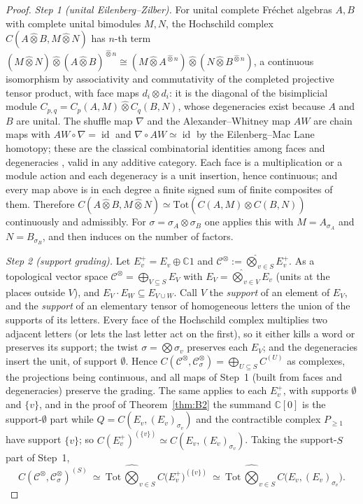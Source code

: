 \documentclass[11pt]{amsart}
\theoremstyle{definition}
\theoremstyle{remark}
\newcommand{\C}{\mathbb C}
\newcommand{\id}{\operatorname{id}}
\begin{document}
\begin{proof}
\emph{Step 1 (unital Eilenberg--Zilber).}  For unital complete Fr\'echet
algebras $A,B$ with complete unital bimodules $M,N$, the Hochschild complex
$C(A\widehat\otimes B,M\widehat\otimes N)$ has $n$-th term
$(M\widehat\otimes N)\widehat\otimes(A\widehat\otimes B)^{\widehat\otimes n}
\cong(M\widehat\otimes A^{\widehat\otimes n})\widehat\otimes
(N\widehat\otimes B^{\widehat\otimes n})$, a continuous isomorphism by
associativity and commutativity of the completed projective tensor product,
with face maps $d_i\otimes d_i$: it is the diagonal of the bisimplicial module
$C_{p,q}=C_p(A,M)\widehat\otimes C_q(B,N)$, whose degeneracies exist because
$A$ and $B$ are unital.  The shuffle map $\nabla$ and the Alexander--Whitney
map $AW$ are chain maps with $AW\circ\nabla=\id$ and $\nabla\circ AW\simeq\id$
by the Eilenberg--Mac Lane homotopy; these are the classical combinatorial
identities among faces and degeneracies \cite[VIII.8]{MacLane}, valid in any
additive category.  Each face is a multiplication or a module action and each
degeneracy is a unit insertion, hence continuous; and every map above is in
each degree a finite signed sum of finite composites of them.  Therefore
$C(A\widehat\otimes B,M\widehat\otimes N)\simeq
\mathrm{Tot}(C(A,M)\widehat\otimes C(B,N))$ continuously and admissibly.  For
$\sigma=\sigma_A\otimes\sigma_B$ one applies this with $M=A_{\sigma_A}$ and
$N=B_{\sigma_B}$, and then induces on the number of factors.

\emph{Step 2 (support grading).}  Let $E_v^{+}=E_v\oplus\C1$ and
$\mathcal C^{\otimes}:=\widehat\bigotimes_{v\in S}E_v^{+}$.  As a topological
vector space $\mathcal C^{\otimes}=\bigoplus_{V\subseteq S}E_V$ with
$E_V=\widehat\bigotimes_{v\in V}E_v$ (units at the places outside $V$), and
$E_V\cdot E_W\subseteq E_{V\cup W}$.  Call $V$ the \emph{support} of an element
of $E_V$, and the \emph{support} of an elementary tensor of homogeneous letters
the union of the supports of its letters.  Every face of the Hochschild
complex multiplies two adjacent letters (or lets the last letter act on the
first), so it either kills a word or preserves its support; the twist
$\sigma=\bigotimes\sigma_v$ preserves each $E_V$; and the degeneracies insert
the unit, of support $\emptyset$.  Hence $C(\mathcal C^{\otimes},
\mathcal C^{\otimes}_{\sigma})=\bigoplus_{U\subseteq S}C^{(U)}$ as complexes, the
projections being continuous, and all maps of Step~1 (built from faces and
degeneracies) preserve the grading.  The same applies to each $E_v^{+}$, with
supports $\emptyset$ and $\{v\}$, and in the proof of Theorem~\ref{thm:B2} the
summand $\C[0]$ is the support-$\emptyset$ part while $Q=C(E_v,(E_v)_{\sigma_v})$
and the contractible complex $P_{\ge1}$ have support $\{v\}$; so
$C(E_v^{+})^{(\{v\})}\simeq C(E_v,(E_v)_{\sigma_v})$.  Taking the support-$S$
part of Step~1,
\begin{equation}\label{eq:topsupport}
C(\mathcal C^{\otimes},\mathcal C^{\otimes}_{\sigma})^{(S)}\ \simeq\
\mathrm{Tot}\,\widehat\bigotimes_{v\in S}C\bigl(E_v^{+}\bigr)^{(\{v\})}
\ \simeq\ \mathrm{Tot}\,\widehat\bigotimes_{v\in S}C\bigl(E_v,(E_v)_{\sigma_v}\bigr).
\end{equation}


\end{proof}
\end{document}
